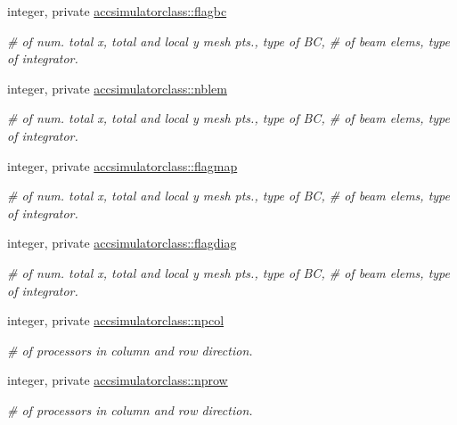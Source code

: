 \begin{DoxyCompactItemize}
integer, private \mbox{\hyperlink{namespaceaccsimulatorclass_a1ba011ab9980a00689505f8cbbd05732}{accsimulatorclass\+::flagbc}}
\begin{DoxyCompactList}\small\item\em \# of num. total x, total and local y mesh pts., type of BC, \# of beam elems, type of integrator. \end{DoxyCompactList}\item 
integer, private \mbox{\hyperlink{namespaceaccsimulatorclass_a99e7feb0e1e3adf9ad845a7425a1b9f7}{accsimulatorclass\+::nblem}}
\begin{DoxyCompactList}\small\item\em \# of num. total x, total and local y mesh pts., type of BC, \# of beam elems, type of integrator. \end{DoxyCompactList}\item 
integer, private \mbox{\hyperlink{namespaceaccsimulatorclass_aeb76c7474e39b4748e1f18d5c44b63ce}{accsimulatorclass\+::flagmap}}
\begin{DoxyCompactList}\small\item\em \# of num. total x, total and local y mesh pts., type of BC, \# of beam elems, type of integrator. \end{DoxyCompactList}\item 
integer, private \mbox{\hyperlink{namespaceaccsimulatorclass_af61313c9e48dba34ab064f69f8d43183}{accsimulatorclass\+::flagdiag}}
\begin{DoxyCompactList}\small\item\em \# of num. total x, total and local y mesh pts., type of BC, \# of beam elems, type of integrator. \end{DoxyCompactList}\end{DoxyCompactItemize}

\textbf{ }\par
\begin{DoxyCompactItemize}
\item 
integer, private \mbox{\hyperlink{namespaceaccsimulatorclass_ac427142c8239a7c9d4d571de0516f6d0}{accsimulatorclass\+::npcol}}
\begin{DoxyCompactList}\small\item\em \# of processors in column and row direction. \end{DoxyCompactList}\item 
integer, private \mbox{\hyperlink{namespaceaccsimulatorclass_ae4ec48c98f1d184540a67f262b362b9c}{accsimulatorclass\+::nprow}}
\begin{DoxyCompactList}\small\item\em \# of processors in column and row direction. \end{DoxyCompactList}\end{DoxyCompactItemize}

